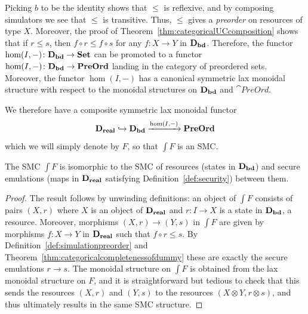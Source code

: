Picking $b$ to be the identity shows that $\leq$ is reflexive, and by composing simulators we see that $\leq$ is transitive.  Thus, $\leq$ gives a \emph{preorder} on resources of type $X$. Moreover, the proof of Theorem~\ref{thm:categoricalUCcomposition} shows that if $r\leq s$, then $f\circ r\leq f\circ s$ for any $f \colon X\to Y$ in $\mathbf{D_{bd}}$. Therefore, the functor $\hom(I,-) \colon \mathbf{D_{bd}}\to\mathbf{Set}$ can be promoted to a functor $\hom(I,-) \colon \mathbf{D_{bd}}\to\mathbf{PreOrd}$ landing in the category of preordered sets. Moreover, the functor $\hom(I,-)$ has a canonical symmetric lax monoidal structure with respect to the monoidal structures on $\mathbf{D_{bd}}$ and $\cat{PreOrd}$. 

We therefore have a composite symmetric lax monoidal functor 
\[\mathbf{D_{real}}\hookrightarrow\mathbf{D_{bd}}\xrightarrow{\hom(I,-)} \mathbf{PreOrd}\]%
which we will simply denote by $F$, so that $\int F$ is an SMC.

\begin{theorem} The SMC $\int F$ is isomorphic to the SMC of resources (states in $\mathbf{D_{bd}}$) and secure emulations (maps in $\mathbf{D_{real}}$ satisfying Definition~\ref{def:security}) between them. 
\end{theorem}

\begin{proof}
The result follows by unwinding definitions: an object of $\int F$ consists of pairs $(X,r)$ where $X$ is an object of $\mathbf{D_{real}}$ and $r\colon I\to X$ is a state in $\mathbf{D_{bd}}$, \ie a resource. Moreover, morphisms $(X,r)\to (Y,s)$ in $\int F$ are given by morphisms $f\colon X\to Y$ in $\mathbf{D_{real}}$ such that $f\circ r\leq s$. By Definition~\ref{def:simulationpreorder} and Theorem~\ref{thm:categoricalcompletenessofdummy} these are exactly the secure emulations $r\to s$. The monoidal structure on $\int F$ is obtained from the lax monoidal structure on $F$, and it is straightforward but tedious to check that this sends the resources $(X,r)$ and $(Y,s)$ to the resources $(X\otimes Y,r\otimes s)$, and thus ultimately results in the same SMC structure. 
\end{proof}